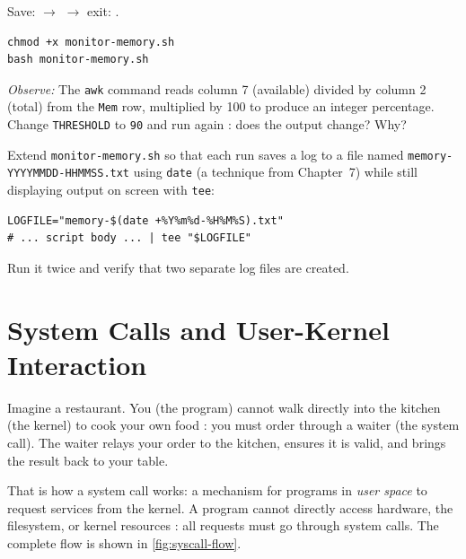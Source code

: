 \begin{notebox}
Save:  $\to$  $\to$ exit: .
\end{notebox}

\begin{lstlisting}[caption={Run the monitor script}]
chmod +x monitor-memory.sh
bash monitor-memory.sh
\end{lstlisting}

\textit{Observe:} The \texttt{awk} command reads column 7 (available) divided by
column 2 (total) from the \texttt{Mem} row, multiplied by 100 to produce an integer
percentage. Change \texttt{THRESHOLD} to \texttt{90} and run again : does the
output change? Why?

\begin{challengebox}
Extend \texttt{monitor-memory.sh} so that each run saves a log to a file named
\texttt{memory-YYYYMMDD-HHMMSS.txt} using \texttt{date} (a technique from Chapter~7)
while still displaying output on screen with \texttt{tee}:
\begin{lstlisting}
LOGFILE="memory-$(date +%Y%m%d-%H%M%S).txt"
# ... script body ... | tee "$LOGFILE"
\end{lstlisting}
Run it twice and verify that two separate log files are created.
\end{challengebox}

\section{System Calls and User-Kernel Interaction}

Imagine a restaurant. You (the program) cannot walk directly into the kitchen
(the kernel) to cook your own food : you must order through a waiter (the
system call). The waiter relays your order to the kitchen, ensures it is valid,
and brings the result back to your table.

That is how a system call works: a mechanism for programs in \textit{user space}
to request services from the kernel. A program cannot directly access hardware,
the filesystem, or kernel resources : all requests must go through system calls.
The complete flow is shown in \cref{fig:syscall-flow}.

